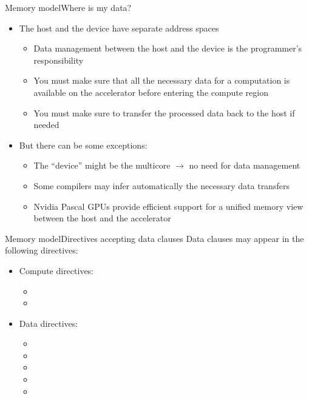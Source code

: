 \documentclass[12pt,aspectratio=169]{beamer}
\begin{document}
\begin{frame}[fragile]{Memory model}{Where is my data?}
  \begin{itemize}
  \item The host and the device have separate address spaces
    \begin{itemize}
    \item Data management between the host and the device is the programmer's responsibility
    \item You must make sure that all the necessary data for a computation is available on the accelerator before entering the compute region
    \item You must make sure to transfer the processed data back to the host if needed
    \end{itemize}
    \pause
  \item But there can be some exceptions:
    \begin{itemize}
    \item The ``device'' might be the multicore $\rightarrow$ no need for data management
    \item Some compilers may infer automatically the necessary data transfers
    \item Nvidia Pascal GPUs provide efficient support for a unified memory view between the host and the accelerator
    \end{itemize}
  \end{itemize}
\end{frame}

\begin{frame}[fragile]{Memory model}{Directives accepting data clauses}
  Data clauses may appear in the following directives:
    \vspace\baselineskip
  \begin{itemize}
  \item Compute directives:
    \begin{itemize}
    \item{}
    \item{}
    \end{itemize}
    \vspace{.5\baselineskip}
  \item Data directives:
    \begin{itemize}
    \item {}
    \item {}
    \item {}
    \item {}
    \item {}
    \end{itemize}
  \end{itemize}
\end{frame}
\end{document}
